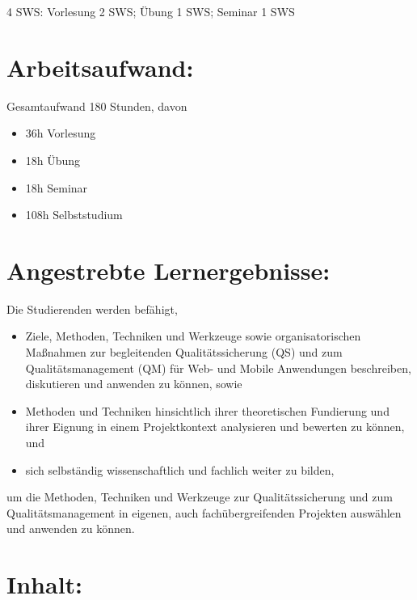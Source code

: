 4 SWS: Vorlesung 2 SWS; Übung 1 SWS; Seminar 1 SWS

\section*{Arbeitsaufwand:\label{/mi-2017/modulbeschreibungen-master/MA_WTW_Modul_QUS_Winter}}\label{arbeitsaufwandpathlabelmi-2017modulbeschreibungen-mastermaux5fwtwux5fmodulux5fqusux5fwinter}

Gesamtaufwand 180 Stunden, davon

\begin{itemize}
\tightlist
\item
  36h Vorlesung
\item
  18h Übung
\item
  18h Seminar
\item
  108h Selbststudium
\end{itemize}

\section*{Angestrebte
Lernergebnisse:\label{/mi-2017/modulbeschreibungen-master/MA_WTW_Modul_QUS_Winter}}\label{angestrebte-lernergebnissepathlabelmi-2017modulbeschreibungen-mastermaux5fwtwux5fmodulux5fqusux5fwinter}

Die Studierenden werden befähigt,

\begin{itemize}
\tightlist
\item
  Ziele, Methoden, Techniken und Werkzeuge sowie organisatorischen
  Maßnahmen zur begleitenden Qualitätssicherung (QS) und zum
  Qualitätsmanagement (QM) für Web- und Mobile Anwendungen beschreiben,
  diskutieren und anwenden zu können, sowie
\item
  Methoden und Techniken hinsichtlich ihrer theoretischen Fundierung und
  ihrer Eignung in einem Projektkontext analysieren und bewerten zu
  können, und
\item
  sich selbständig wissenschaftlich und fachlich weiter zu bilden,
\end{itemize}

um die Methoden, Techniken und Werkzeuge zur Qualitätssicherung und zum
Qualitätsmanagement in eigenen, auch fachübergreifenden Projekten
auswählen und anwenden zu können.

\section*{Inhalt:\label{/mi-2017/modulbeschreibungen-master/MA_WTW_Modul_QUS_Winter}}\label{inhaltpathlabelmi-2017modulbeschreibungen-mastermaux5fwtwux5fmodulux5fqusux5fwinter}

